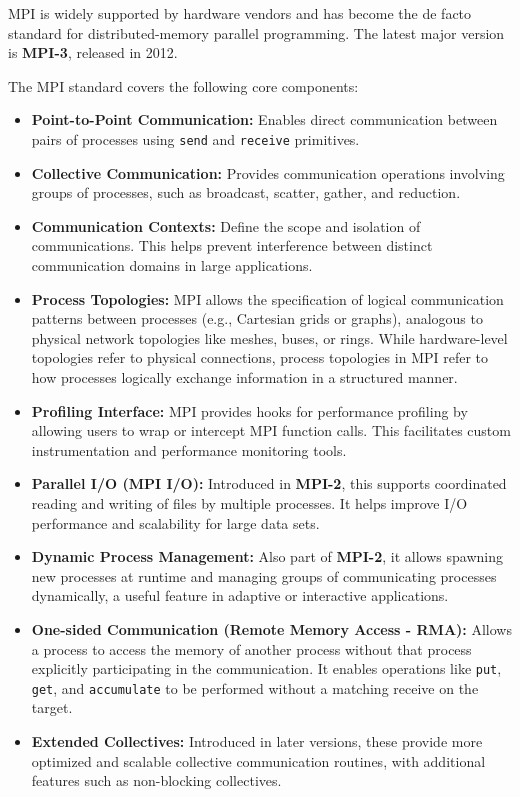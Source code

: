 \documentclass[12pt]{book}
\begin{document}
MPI is widely supported by hardware vendors and has become the de facto standard for distributed-memory parallel programming. The latest major version is \textbf{MPI-3}, released in 2012.

The MPI standard covers the following core components:

\begin{itemize}
    \item \textbf{Point-to-Point Communication:} Enables direct communication between pairs of processes using \texttt{send} and \texttt{receive} primitives.

    \item \textbf{Collective Communication:} Provides communication operations involving groups of processes, such as broadcast, scatter, gather, and reduction.

    \item \textbf{Communication Contexts:} Define the scope and isolation of communications. This helps prevent interference between distinct communication domains in large applications.

    \item \textbf{Process Topologies:} MPI allows the specification of logical communication patterns between processes (e.g., Cartesian grids or graphs), analogous to physical network topologies like meshes, buses, or rings. While hardware-level topologies refer to physical connections, process topologies in MPI refer to how processes logically exchange information in a structured manner.

    \item \textbf{Profiling Interface:} MPI provides hooks for performance profiling by allowing users to wrap or intercept MPI function calls. This facilitates custom instrumentation and performance monitoring tools.

    \item \textbf{Parallel I/O (MPI I/O):} Introduced in \textbf{MPI-2}, this supports coordinated reading and writing of files by multiple processes. It helps improve I/O performance and scalability for large data sets.

    \item \textbf{Dynamic Process Management:} Also part of \textbf{MPI-2}, it allows spawning new processes at runtime and managing groups of communicating processes dynamically, a useful feature in adaptive or interactive applications.

    \item \textbf{One-sided Communication (Remote Memory Access - RMA):} Allows a process to access the memory of another process without that process explicitly participating in the communication. It enables operations like \texttt{put}, \texttt{get}, and \texttt{accumulate} to be performed without a matching receive on the target.

    \item \textbf{Extended Collectives:} Introduced in later versions, these provide more optimized and scalable collective communication routines, with additional features such as non-blocking collectives.
\end{itemize}
\end{document}
